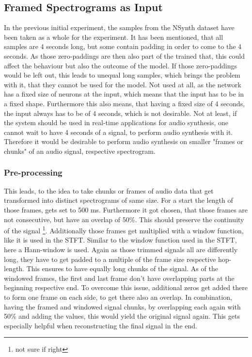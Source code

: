 \subsection{Framed Spectrograms as Input}
In the previous initial experiment, the samples from the NSynth dataset have been taken as a whole for the experiment. It has been mentioned, that all samples are 4 seconds long, but some contain padding in order to come to the 4 seconds. As those zero-paddings are then also part of the trained that, this could affect the behaviour but also the outcome of the model. If those zero-paddings would be left out, this leads to unequal long samples, which brings the problem with it, that they cannot be used for the model. Not used at all, as the network has a fixed size of neurons at the input, which means that the input has to be in a fixed shape. Furthermore this also means, that having a fixed size of 4 seconds, the input always has to be of 4 seconds, which is not desirable. Not at least, if the system should be used in real-time applications for audio synthesis, one cannot wait to have 4 seconds of a signal, to perform audio synthesis with it. Therefore it would be desirable to perform audio synthesis on smaller "frames or chunks" of an audio signal, respective spectrogram. 

\subsubsection{Pre-processing}
This leads, to the idea to take chunks or frames of audio data that get transformed into distinct spectrograms of same size. For a start the length of those frames, gets set to 500 ms. Furthermore it got chosen, that those frames are not consecutive, but have an overlap of 50\%. This should preserve the continuity of the signal \footnote{not sure if right}. Additionally those frames get multiplied with a window function, like it is used in the STFT. Similar to the window function used in the STFT, here a Hann-window is used.  Again as those trimmed signals all are differently long, they have to get padded to a multiple of the frame size respective hop-length. This ensures to have equally long chunks of the signal. As of the windowed frames, the first and last frame don't have overlapping parts at the beginning respective end. To overcome this issue, additional zeros get added there to form one frame on each side, to get there also an overlap. In combination, having the framed and windowed signal chunks, by overlapping each again with 50\% and adding the values, this would yield the original signal again. This gets especially helpful when reconstructing the final signal in the end. 

